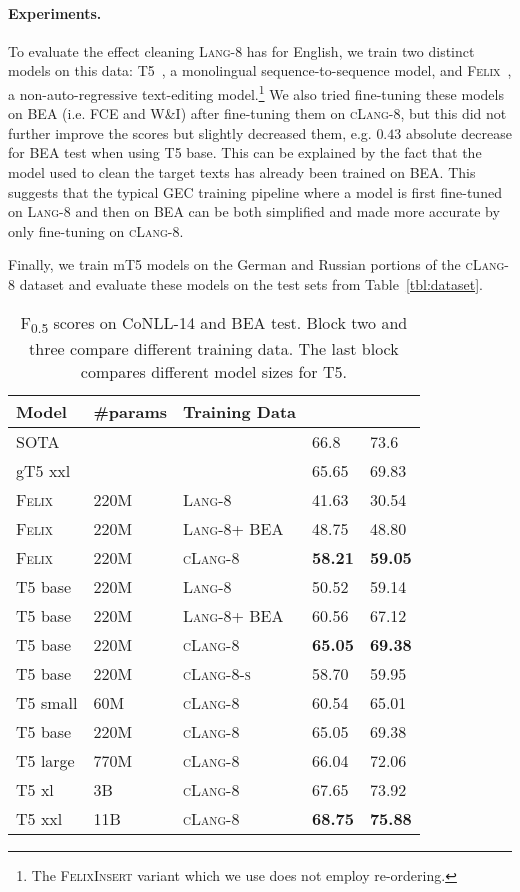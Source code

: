 \documentclass[11pt,a4paper]{article}
\newcommand{\lang}[0]{{\scshape Lang-8}\xspace}
\newcommand{\clangg}[0]{{\scshape cLang-8}\xspace}
\newcommand{\clangs}[0]{{\scshape cLang-8-s}\xspace}
\newcommand{\beatrain}[0]{BEA\xspace}
\newcommand{\INSERTION}[0]{{\scshape Felix}\xspace} \newcommand{\fzero}[0]{F\textsubscript{0.5}\xspace}
\newcommand{\conll}[0]{CoNLL-14\xspace}
\newcommand{\beatest}[0]{BEA test\xspace}
\newcommand*\rot{\rotatebox{60}}
\begin{document}
\paragraph*{Experiments.}
To evaluate the effect cleaning \lang has for English, we train two distinct models on this data: T5~\cite{t5}, a monolingual sequence-to-sequence model, and \INSERTION~\cite{mallinson-etal-2020-felix}, a non-auto-regressive text-editing model.\footnote{The \textsc{FelixInsert} variant which we use does not employ re-ordering.}
We also tried fine-tuning these models on \beatrain{} (i.e. FCE and W\&I) after fine-tuning them on \clangg, but this did not further improve the scores but slightly decreased them, e.g. $0.43$ absolute decrease for BEA test when using T5 base.
This can be explained by the fact that the model used to clean the target texts has already been trained on \beatrain.
This suggests that the typical GEC training pipeline where a model is first fine-tuned on \lang and then on \beatrain{} can be both simplified and made more accurate by only fine-tuning on \clangg.

Finally, we train mT5 models on the German and Russian portions of the \clangg dataset and evaluate these models on the test sets from Table~\ref{tbl:dataset}.

\begin{table}[t]
\footnotesize
\setlength{\tabcolsep}{5pt}
\begin{tabularx}{\columnwidth}{llXll}
\toprule
Model & \#params & Training Data & \rot{\conll}  & \rot{\beatest}  \\
\midrule
SOTA  &  & & 66.8 & 73.6  \\ 
gT5 xxl & & & 65.65 & 69.83 \\
\midrule
\INSERTION  & 220M & \lang & 41.63 &  30.54 \\
\INSERTION  & 220M & \lang + \textsc{BEA} & 48.75 & 48.80  \\ 
\INSERTION  & 220M & \clangg & \textbf{58.21} & \textbf{59.05} \\ 
\midrule
T5 base & 220M & \lang & 50.52 & 59.14	 \\
T5 base & 220M & \lang + \textsc{BEA}  & 60.56 & 67.12	 \\
T5 base & 220M & \clangg & \textbf{65.05} & \textbf{69.38} \\ 
T5 base & 220M & \clangs & 58.70 & 59.95 \\ 
\midrule
T5 small & 60M & \clangg & 60.54 & 65.01 \\ 
T5 base  & 220M & \clangg & 65.05 &  69.38	 \\ 
T5 large & 770M & \clangg & 66.04 & 72.06 \\ 
T5 xl    & 3B & \clangg & 67.65 & 73.92 \\ 
T5 xxl   & 11B & \clangg & \textbf{68.75} & \textbf{75.88} \\ 
\bottomrule
\end{tabularx}
\caption{\fzero scores on \conll and \beatest. Block two and three compare different training data. The last block compares different model sizes for T5.}
\label{tbl:clang8-results}
\end{table}
\end{document}

